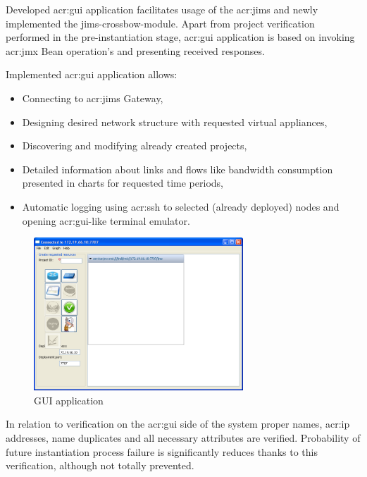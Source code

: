 \documentclass[11pt,openany]{book}
\begin{document}
        Developed \gls{acr:gui} application facilitates usage of the \gls{acr:jims} and newly implemented the
        jims-crossbow-module.  Apart from project verification performed in the pre-instantiation stage, \gls{acr:gui}
        application is based on invoking \gls{acr:jmx} Bean operation's and presenting received responses.

        Implemented \gls{acr:gui} application allows:

        \begin{itemize}
          \item Connecting to \gls{acr:jims} Gateway,
          \item Designing desired network structure with requested virtual appliances,
          \item Discovering and modifying already created projects,
          \item Detailed information about links and flows like bandwidth consumption presented in charts for requested
                time periods,
          \item Automatic logging using \gls{acr:ssh} to selected (already deployed) nodes and opening
                \gls{acr:gui}-like terminal emulator.
        \end{itemize}

        \begin{figure}[H]
          \centering
          \includegraphics[width=0.7\textwidth]{img/impl/gui.png}

          \caption{GUI application}
        \end{figure}

        In relation to verification on the \gls{acr:gui} side of the system proper names, \gls{acr:ip} addresses, name
        duplicates and all necessary attributes are verified. Probability of future instantiation process failure is
        significantly reduces thanks to this verification, although not totally prevented.
\end{document}
